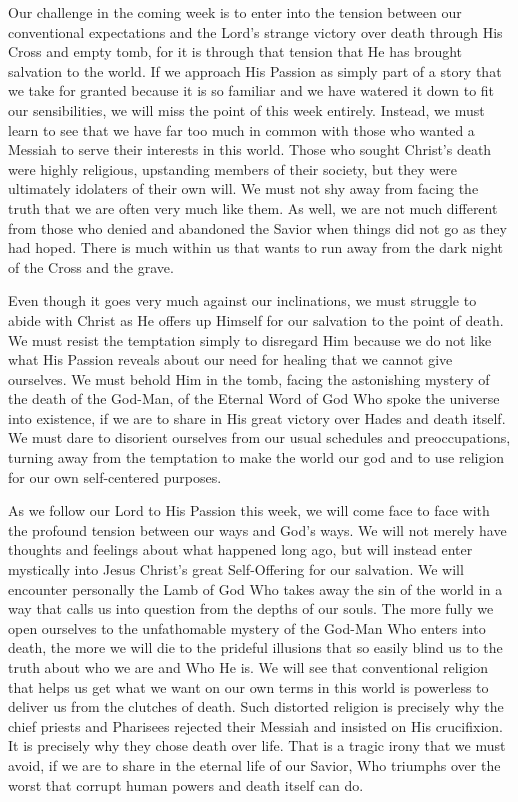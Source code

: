 \documentclass[twoside, letterpaper, 12pt]{report}
\begin{document}
\begin{maybetwocolumns}
Our challenge in the coming week is to enter into the tension between our conventional
expectations and the Lord’s strange victory over death through His Cross and empty tomb, for it
is through that tension that He has brought salvation to the world. If we approach His Passion as
simply part of a story that we take for granted because it is so familiar and we have watered it
down to fit our sensibilities, we will miss the point of this week entirely. Instead, we must learn
to see that we have far too much in common with those who wanted a Messiah to serve their
interests in this world. Those who sought Christ’s death were highly religious, upstanding
members of their society, but they were ultimately idolaters of their own will. We must not shy
away from facing the truth that we are often very much like them. As well, we are not much
different from those who denied and abandoned the Savior when things did not go as they had
hoped. There is much within us that wants to run away from the dark night of the Cross and the
grave.

Even though it goes very much against our inclinations, we must struggle to abide with Christ as
He offers up Himself for our salvation to the point of death. We must resist the temptation simply
to disregard Him because we do not like what His Passion reveals about our need for healing that
we cannot give ourselves. We must behold Him in the tomb, facing the astonishing mystery of
the death of the God-Man, of the Eternal Word of God Who spoke the universe into existence, if
we are to share in His great victory over Hades and death itself. We must dare to disorient
ourselves from our usual schedules and preoccupations, turning away from the temptation to make
the world our god and to use religion for our own self-centered purposes.

As we follow our Lord to His Passion this week, we will come face to face with the profound
tension between our ways and God’s ways. We will not merely have thoughts and feelings about
what happened long ago, but will instead enter mystically into Jesus Christ’s great Self-Offering
for our salvation. We will encounter personally the Lamb of God Who takes away the sin of the
world in a way that calls us into question from the depths of our souls. The more fully we open
ourselves to the unfathomable mystery of the God-Man Who enters into death, the more we will
die to the prideful illusions that so easily blind us to the truth about who we are and Who He is.
We will see that conventional religion that helps us get what we want on our own terms in this
world is powerless to deliver us from the clutches of death. Such distorted religion is precisely
why the chief priests and Pharisees rejected their Messiah and insisted on His crucifixion. It is
precisely why they chose death over life. That is a tragic irony that we must avoid, if we are to
share in the eternal life of our Savior, Who triumphs over the worst that corrupt human powers
and death itself can do.


\end{maybetwocolumns}
\end{document}
